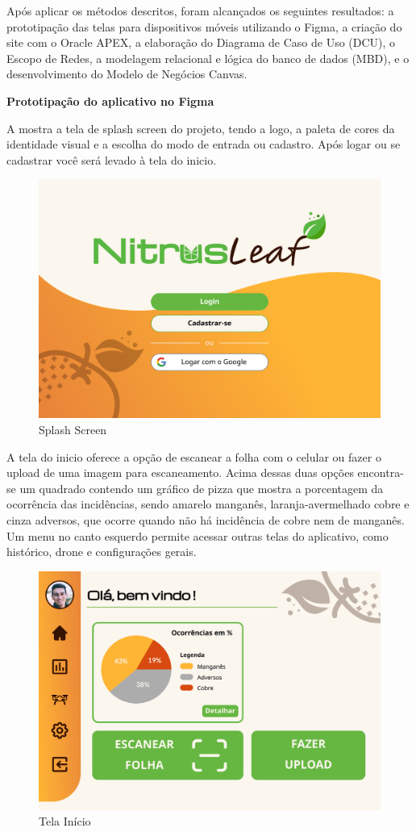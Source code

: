 Após aplicar os métodos descritos, foram alcançados os seguintes resultados: a prototipação das telas para dispositivos móveis utilizando o Figma, a criação do site com o Oracle APEX, a elaboração do Diagrama de Caso de Uso (DCU), o Escopo de Redes, a modelagem relacional e lógica do banco de dados (MBD), e o desenvolvimento do Modelo de Negócios Canvas.

\textbf{Prototipação do aplicativo no Figma}

A  mostra a tela de splash screen do projeto, tendo a logo, a paleta de cores da identidade visual e a escolha do modo de entrada ou cadastro. Após logar ou se cadastrar você será levado à tela do inicio. 

\begin{figure}[H]
\centering
\caption{Splash Screen}%
\label{fig:splash-screen}
\includegraphics[width=0.8\linewidth]{Illustrations/Splash-Screen.png}
\end{figure}

A tela do inicio  oferece a opção de escanear a folha com o celular ou fazer o upload de uma imagem para escaneamento. Acima dessas duas opções encontra-se um quadrado contendo um gráfico de pizza que mostra a porcentagem da ocorrência das incidências, sendo amarelo manganês, laranja-avermelhado cobre e cinza adversos, que ocorre quando não há incidência de cobre nem de manganês. Um menu no canto esquerdo permite acessar outras telas do aplicativo, como histórico, drone e configurações gerais.

\begin{figure}[H]
\centering
\caption{Tela Início}%
\label{fig:tela-inicio}
\includegraphics[width=0.8\linewidth]{Illustrations/tela-inicio.png}
\end{figure}

